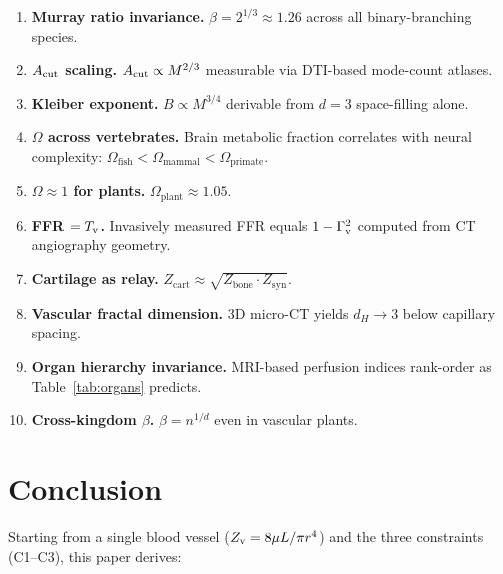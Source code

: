 \documentclass[aps,pre,twocolumn,superscriptaddress,floatfix]{revtex4-2}
\begin{document}
\begin{enumerate}
  \item \textbf{Murray ratio invariance.}
    $\beta = 2^{1/3} \approx 1.26$ across all
    binary-branching species.
  \item \textbf{$A_{\text{cut}}$ scaling.}
    $A_{\text{cut}} \propto M^{2/3}$ measurable via DTI-based
    mode-count atlases.
  \item \textbf{Kleiber exponent.}
    $B \propto M^{3/4}$ derivable from $d=3$
    space-filling alone.
  \item \textbf{$\Omega$ across vertebrates.}
    Brain metabolic fraction correlates with neural
    complexity:
    $\Omega_{\text{fish}} < \Omega_{\text{mammal}} <
    \Omega_{\text{primate}}$.
  \item \textbf{$\Omega \approx 1$ for plants.}
    $\Omega_{\text{plant}} \approx 1.05$.
  \item \textbf{FFR $= T_{\text{v}}$.}
    Invasively measured FFR equals $1-\Gamma_{\text{v}}^2$ computed
    from CT angiography geometry.
  \item \textbf{Cartilage as relay.}
    $Z_{\text{cart}} \approx
    \sqrt{Z_{\text{bone}}\cdot Z_{\text{syn}}}$.
  \item \textbf{Vascular fractal dimension.}
    3D micro-CT yields $d_H \to 3$ below capillary
    spacing.
  \item \textbf{Organ hierarchy invariance.}
    MRI-based perfusion indices rank-order as
    Table~\ref{tab:organs} predicts.
  \item \textbf{Cross-kingdom $\beta$.}
    $\beta = n^{1/d}$ even in vascular plants.
\end{enumerate}


\section{Conclusion}
\label{sec:conclusion}

Starting from a single blood vessel ($Z_{\text{v}} = 8\mu L/\pi r^4$)
and the three constraints (C1--C3), this paper derives:
\end{document}
